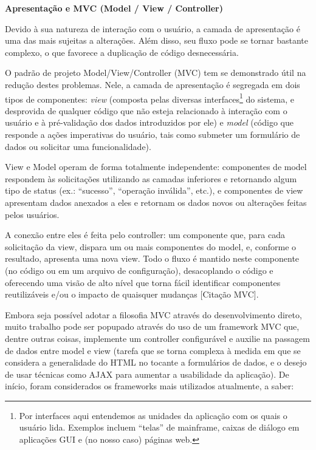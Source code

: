 \documentclass[12pt,twoside]{article}
\begin{document}
{\sffamily\bfseries\upshape
Apresenta\c{c}\~ao e MVC (Model / View / Controller)}

{\upshape
Devido \`a sua natureza de intera\c{c}\~ao com o usu\'ario, a camada de
apresenta\c{c}\~ao \'e uma das mais sujeitas a altera\c{c}\~oes. Al\'em
disso, seu fluxo pode se tornar bastante complexo, o que favorece a
duplica\c{c}\~ao de c\'odigo desnecess\'aria.}

{\upshape
O padr\~ao de projeto Model/View/Controller (MVC) tem se demonstrado
\'util na redu\c{c}\~ao destes problemas. Nele, a camada de
apresenta\c{c}\~ao \'e segregada em dois tipos de componentes:
\textit{view} (composta pelas diversas interfaces\footnote{Por
interfaces aqui entendemos as unidades da aplica\c{c}\~ao com os quais
o usu\'ario lida. Exemplos incluem ``telas'' de mainframe, caixas de
di\'alogo em aplica\c{c}\~oes GUI e (no nosso caso) p\'aginas web.} do
sistema, e desprovida de qualquer c\'odigo que n\~ao esteja relacionado
\`a intera\c{c}\~ao com o usu\'ario e \`a pr\'e{}-valida\c{c}\~ao dos
dados introduzidos por ele) e \textit{model} (c\'odigo que responde a
a\c{c}\~oes imperativas do usu\'ario, tais como submeter um
formul\'ario de dados ou solicitar uma funcionalidade).}

{\upshape
View e Model operam de forma totalmente independente: componentes de
model respondem \`as solicita\c{c}\~oes utilizando as camadas
inferiores e retornando algum tipo de status (ex.: ``sucesso'',
``opera\c{c}\~ao inv\'alida'', etc.), e componentes de view apresentam
dados anexados a eles e retornam os dados novos ou altera\c{c}\~oes
feitas pelos usu\'arios.}

{\upshape
A conex\~ao entre eles \'e feita pelo controller: um componente que,
para cada solicita\c{c}\~ao da view, dispara um ou mais componentes do
model, e, conforme o resultado, apresenta uma nova view. Todo o fluxo
\'e mantido neste componente (no c\'odigo ou em um arquivo de
configura\c{c}\~ao), desacoplando o c\'odigo e oferecendo uma vis\~ao
de alto n\'ivel que torna f\'acil identificar componentes
reutiliz\'aveis e/ou o impacto de quaisquer mudan\c{c}as [Cita\c{c}\~ao
MVC].}

{\upshape
Embora seja poss\'ivel adotar a filosofia MVC atrav\'es do
desenvolvimento direto, muito trabalho pode ser popupado atrav\'es do
uso de um framework MVC que, dentre outras coisas, implemente um
controller configur\'avel e auxilie na passagem de dados entre model e
view (tarefa que se torna complexa \`a medida em que se considera a
generalidade do HTML no tocante a formul\'arios de dados, e o desejo de
usar t\'ecnicas como AJAX para aumentar a usabilidade da
aplica\c{c}\~ao). De in\'icio, foram considerados os frameworks mais
utilizados atualmente, a saber:}
\end{document}
